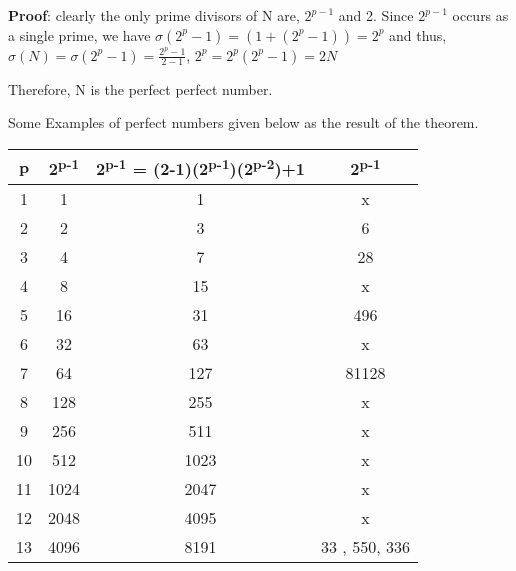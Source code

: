 \documentclass[12pt,,a4paper]{article}
\begin{document}
\textbf{Proof}: clearly the only prime divisors of N are, \(2^{p-1}\) and 2. Since \(2^{p-1}\) occurs as a single prime, we have \(\sigma(2^p-1) = (1 + (2^p-1)) = 2^p\) and thus, 
\(\sigma(N) = \sigma(2^p-1) = \frac{{2^p - 1}}{{2-1}}\), \(2^p = 2^p (2^p-1) = 2N\)

Therefore, N is the perfect perfect number.

Some Examples of perfect numbers given below  as the result of the theorem.
\vspace{20pt}


\begin{tabular}{|c|c|c|c|}
\hline
\textbf{p} & \textbf{2\textsuperscript{p-1}} & \textbf{2\textsuperscript{p-1} = (2-1)(2\textsuperscript{p-1})(2\textsuperscript{p-2})+1} & \textbf{2\textsuperscript{p-1}} \\
\hline
1 & 1 & 1 & x \\
\hline
2 & 2 & 3 & 6 \\
\hline
3 & 4 & 7 & 28 \\
\hline
4 & 8 & 15 & x \\
\hline
5 & 16 & 31 & 496 \\
\hline
6 & 32 & 63 & x \\
\hline
7 & 64 & 127 & 81128 \\
\hline
8 & 128 & 255 & x \\
\hline
9 & 256 & 511 & x \\
\hline
10 & 512 & 1023 & x \\
\hline
11 & 1024 & 2047 & x \\
\hline
12 & 2048 & 4095 & x \\
\hline
13 & 4096 & 8191 & 33 , 550, 336 \\
\hline
\end{tabular}

\vspace{20pt}
\newline 
\end{document}
